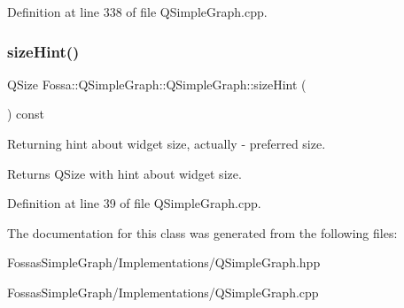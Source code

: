 Definition at line 338 of file Q\+Simple\+Graph.\+cpp.

\mbox{\label{class_fossa_1_1_q_simple_graph_1_1_q_simple_graph_a7cc7465f2137a1d9f80425afec47faeb}} 
\subsubsection{\texorpdfstring{size\+Hint()}{sizeHint()}}
{\footnotesize\ttfamily Q\+Size Fossa\+::\+Q\+Simple\+Graph\+::\+Q\+Simple\+Graph\+::size\+Hint (\begin{DoxyParamCaption}{ }\end{DoxyParamCaption}) const}



Returning hint about widget size, actually -\/ preferred size. 

\begin{DoxyReturn}{Returns}
Q\+Size with hint about widget size. 
\end{DoxyReturn}


Definition at line 39 of file Q\+Simple\+Graph.\+cpp.



The documentation for this class was generated from the following files\+:\begin{DoxyCompactItemize}
\item 
Fossas\+Simple\+Graph/\+Implementations/Q\+Simple\+Graph.\+hpp\item 
Fossas\+Simple\+Graph/\+Implementations/Q\+Simple\+Graph.\+cpp\end{DoxyCompactItemize}
